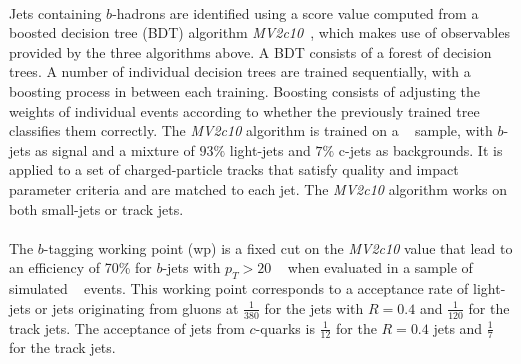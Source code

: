\paragraph{}
Jets containing $b$-hadrons are identified using a score value computed from a boosted decision tree (BDT) algorithm \emph{MV2c10}~\cite{btaggingRun2, Aad:2015ydr}, which makes use of observables provided by the three algorithms above.
A BDT consists of a forest of decision trees.
A number of individual decision trees are trained sequentially, with a boosting process in between each training. 
Boosting consists of adjusting the weights of individual events according to whether the previously trained tree classifies them correctly.
The \emph{MV2c10} algorithm is trained on a \ttbar~ sample, with $b$-jets as signal and a mixture of $93\%$ light-jets and $7\%$ c-jets as backgrounds. 
It is applied to a set of charged-particle tracks that satisfy quality and impact parameter criteria and are matched to each jet. 
The \emph{MV2c10} algorithm works on both small-\R jets or track jets.

\paragraph{}
The $b$-tagging working point (wp) is a fixed cut on the \emph{MV2c10} value that lead to an efficiency of 70\% for $b$-jets with $p_T > 20$ \GeV~ when evaluated in a sample of simulated \ttbar~ events. 
This working point corresponds to a acceptance rate of light-jets or jets originating from gluons at $\frac{1}{380}$ for the jets with $R=0.4$ and $\frac{1}{120}$ for the track jets. The acceptance of jets from $c$-quarks is $\frac{1}{12}$ for the $R=0.4$ jets and $\frac{1}{7}$ for the track jets.

